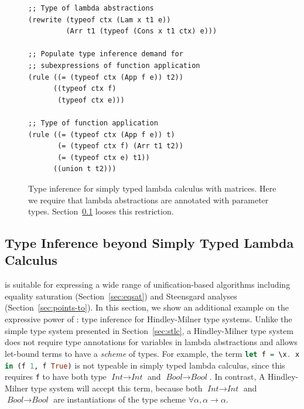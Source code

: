 \begin{figure}
\begin{minipage}[t]{0.48\linewidth}
\begin{lstlisting}[language=egglog]
;; Type of lambda abstractions
(rewrite (typeof ctx (Lam x t1 e))
         (Arr t1 (typeof (Cons x t1 ctx) e)))

;; Populate type inference demand for
;; subexpressions of function application
(rule ((= (typeof ctx (App f e)) t2))
      ((typeof ctx f)
       (typeof ctx e)))

;; Type of function application
(rule ((= (typeof ctx (App f e)) t)
       (= (typeof ctx f) (Arr t1 t2))
       (= (typeof ctx e) t1))
      ((union t t2)))
\end{lstlisting}
\caption{Type inference for simply typed lambda calculus
 with matrices.
 Here we require that lambda abstractions are annotated with parameter types.
 Section~\ref{sec:hm} looses this restriction.}
\label{fig:stlc}
\end{minipage}
\end{figure}

\subsection{Type Inference beyond Simply Typed Lambda Calculus}\label{sec:hm}

\Egglog is suitable for expressing a wide range of unification-based algorithms
 including equality saturation (Section~\ref{sec:eqsat}) and Steensgard analyses (Section~\ref{sec:points-to}).
In this section, we show an additional example on the expressive power of \egglog:
 type inference for Hindley-Milner type systems.
Unlike the simple type system presented in Section~\ref{sec:stlc},
 a Hindley-Milner type system does not require type annotations for variables in lambda abstractions
 and allows let-bound terms to have a \textit{scheme} of types.
For example, the term \lstinline[language=Haskell]{let f = \x. x in (f 1, f True)}
 is not typeable in simply typed lambda calculus,
 since this requires \lstinline{f} to have both type $\textit{Int}\rightarrow\textit{Int}$
 and $\textit{Bool}\rightarrow\textit{Bool}$.
In contrast, A Hindley-Milner type system will accept this term,
 because both $\textit{Int}\rightarrow\textit{Int}$
 and $\textit{Bool}\rightarrow\textit{Bool}$ are instantiations of the type scheme
 $\forall \alpha,\alpha\rightarrow\alpha$.

